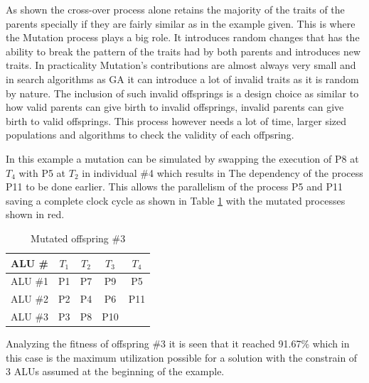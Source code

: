 \documentclass[conference]{IEEEtran}
\begin{document}
As shown the cross-over process alone retains the majority of the traits of the parents specially if they are fairly similar as in the example given. This is where the Mutation process plays a big role. It introduces random changes that has the ability to break the pattern of the traits had by both parents and introduces new traits. In practicality Mutation's contributions are almost always very small and in search algorithms as GA it can introduce a lot of invalid traits as it is random by nature. The inclusion of such invalid offsprings is a design choice as similar to how valid parents can give birth to invalid offsprings, invalid parents can give birth to valid offsprings. This process however needs a lot of time, larger sized populations and algorithms to check the validity of each offpsring.

In this example a mutation can be simulated by swapping the execution of P8 at $T_4$ with P5 at $T_2$ in individual \#4 which results in The dependency of the process P11 to be done earlier. This allows the parallelism  of the process P5 and P11 saving a complete clock cycle as shown in Table \ref{tab:mutated} with the mutated processes shown in red.
\begin{table}[h!]
    \centering
    \begin{tabular}{|c|c|c|c|c|}
        \hline
    ALU \#  & $T_1$ & $T_2$ &  $T_3$& $T_4$ \\
    \hline
       ALU \#1  &\cellcolor[HTML]{51C004} P1 &\cellcolor[HTML]{51C004} P7 & \cellcolor[HTML]{0079EA} P9& \cellcolor[HTML]{E60000}P5 \\
       \hline
       ALU \#2  &  \cellcolor[HTML]{51C004}P2 &\cellcolor[HTML]{0079EA}  P4 & \cellcolor[HTML]{51C004}P6 & P11 \\
       \hline
       ALU \#3  &\cellcolor[HTML]{0079EA} P3 & \cellcolor[HTML]{E60000}P8  & \cellcolor[HTML]{51C004}P10 &  \\
       \hline
    \end{tabular}
           \vspace{2pt}
    \caption{Mutated offspring \#3}
    \label{tab:mutated}
    \end{table}

Analyzing the fitness of offspring \#3 it is seen that it reached 91.67\% which in this case is the maximum utilization possible for a solution with the constrain of 3 ALUs assumed at the beginning of the example.
 

\end{document}
